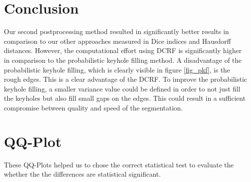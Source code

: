 \documentclass[journal]{IEEEtran}
\begin{document}
\section{Conclusion}
Our second postprocessing method resulted in significantly better results in comparison to our other approaches measured in Dice indices and Hausdorff distances. However, the computational effort using DCRF is significantly higher in comparison to the probabilistic keyhole filling method. A disadvantage of the probabilistic keyhole filling, which is clearly visible in figure \ref{fig_pkf}, is the rough edges. This is a clear advantage of the DCRF. To improve the probabilistic keyhole filling, a smaller variance value could be defined in order to not just fill the keyholes but also fill small gaps on the edges. This could result in a sufficient compromise between quality and speed of the segmentation.





%

\newpage
\appendices
\section{QQ-Plot}
\label{sec_qq}
These QQ-Plots helped us to chose the correct statistical test to evaluate the whether the the differences are statistical significant. 
\end{document}
